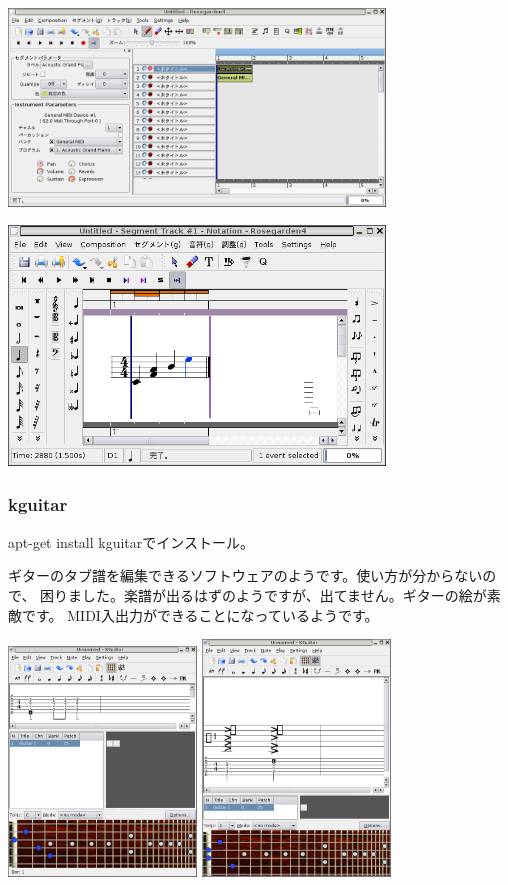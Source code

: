 \documentclass[mingoth,a4paper]{jsarticle}
\begin{document}
\includegraphics[width=10cm]{image200602/rosegarden4-1.png}

\includegraphics[width=10cm]{image200602/rosegarden4-2.png}

\subsubsection{kguitar}

apt-get install kguitarでインストール。

ギターのタブ譜を編集できるソフトウェアのようです。使い方が分からないので、
困りました。楽譜が出るはずのようですが、出てません。ギターの絵が素敵です。
MIDI入出力ができることになっているようです。

\includegraphics[width=5cm]{image200602/kguitar.png}
\includegraphics[width=5cm]{image200602/kguitar2.png}
\end{document}
